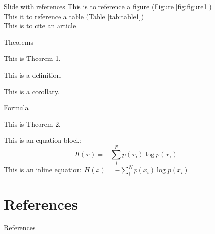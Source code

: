 \documentclass{beamer}
\begin{document}
    \begin{frame}{Slide with references}
        This is to reference a figure (Figure \ref{fig:figure1})\\
        This it to reference a table (Table \ref{tab:table1})\\
        This is to cite an article \cite{vaswani2017attention}\\
    \end{frame}

    \begin{frame}{Theorems}
        \begin{theorem}
            This is Theorem 1.
        \end{theorem}
        \begin{definition}
            This is a definition. 
        \end{definition}
        \begin{corollary}
            This is a corollary. 
        \end{corollary}
    \end{frame}

    \begin{frame}{Formula}
        \begin{theorem}
            This is Theorem 2. 
        \end{theorem}
        This is an equation block: 
        \begin{equation}
            H(x)=-\sum\limits_i^Np(x_i)\log p(x_i).
        \end{equation}
        This is an inline equation: $H(x)=-\sum\limits_i^Np(x_i)\log p(x_i)$
    \end{frame}

    \section{References}

    \begin{frame}[allowframebreaks]{References}
        \printbibliography[heading=none]
    \end{frame}
\end{document}
